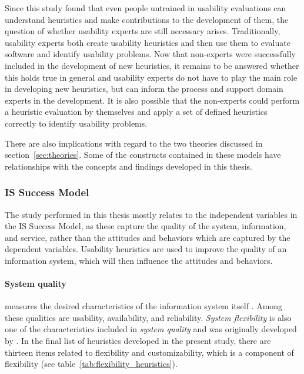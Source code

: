 Since this study found that even people untrained in usability evaluations can understand heuristics and make contributions to the development of them, the question of whether usability experts are still necessary arises. Traditionally, usability experts both create usability heuristics and then use them to evaluate software and identify usability problems. Now that non-experts were successfully included in the development of new heuristics, it remains to be answered whether this holds true in general and usability experts do not have to play the main role in developing new heuristics, but can inform the process and support domain experts in the development. It is also possible that the non-experts could perform a heuristic evaluation by themselves and apply a set of defined heuristics correctly to identify usability problems.

There are also implications with regard to the two theories discussed in section~\ref{sec:theories}. Some of the constructs contained in these models have relationships with the concepts and findings developed in this thesis.

\subsubsection{IS Success Model}
The study performed in this thesis mostly relates to the independent variables in the IS Success Model, as these capture the quality of the system, information, and service, rather than the attitudes and behaviors which are captured by the dependent variables. Usability heuristics are used to improve the quality of an information system, which will then influence the attitudes and behaviors.

\paragraph{System quality} measures the desired characteristics of the information system itself \citep{DeLone2004}. Among these qualities are usability, availability, and reliability. \textit{System flexibility} is also one of the characteristics included in \textit{system quality} and was originally developed by \citet{Hamilton1981a}. In the final list of heuristics developed in the present study, there are thirteen items related to flexibility and customizability, which is a component of flexibility (see table~\ref{tab:flexibility_heuristics}).

